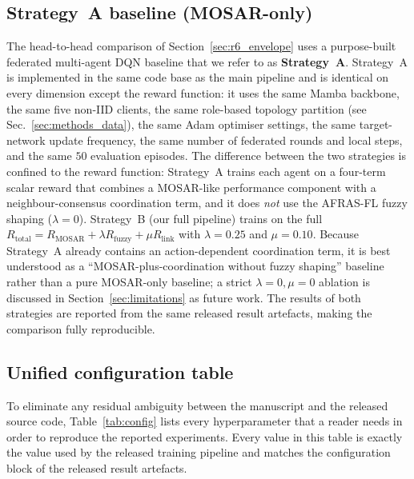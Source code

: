 \documentclass[ai,article,submit,moreauthors,pdftex]{Definitions/mdpi}
\newcommand{\rev}[1]{#1}
\begin{document}
\subsection{Strategy~A baseline (MOSAR-only)}\label{sec:methods_strategy_a}

The head-to-head comparison of Section~\ref{sec:r6_envelope} uses a
purpose-built federated multi-agent DQN baseline that we refer to as
\textbf{Strategy~A}. Strategy~A is implemented in the same code base as
the main pipeline and is identical on every dimension except the reward
function: it uses the same Mamba backbone, the same five non-IID
clients, \rev{the same role-based topology partition (see Sec.~\ref{sec:methods_data})}, the same
Adam optimiser settings, the same target-network update frequency, the
same number of federated rounds and local steps, and the same $50$
evaluation episodes. \rev{The difference between the two strategies is confined to the reward function: Strategy~A trains each agent on a four-term scalar reward that combines a MOSAR-like performance component with a neighbour-consensus coordination term, and it does \emph{not} use the AFRAS-FL fuzzy shaping ($\lambda = 0$). Strategy~B (our full pipeline) trains on the full $R_{\text{total}} = R_{\text{MOSAR}} + \lambda R_{\text{fuzzy}} + \mu R_{\text{link}}$ with $\lambda = 0.25$ and $\mu = 0.10$. Because Strategy~A already contains an action-dependent coordination term, it is best understood as a ``MOSAR-plus-coordination without fuzzy shaping'' baseline rather than a pure MOSAR-only baseline; a strict $\lambda = 0, \mu = 0$ ablation is discussed in Section~\ref{sec:limitations} as future work.} The results of both strategies are
reported from the same released result artefacts, making the comparison fully reproducible.

\rev{\subsection{Unified configuration table}\label{sec:methods_config}
To eliminate any residual ambiguity between the manuscript and the
released source code, Table~\ref{tab:config} lists every hyperparameter
that a reader needs in order to reproduce the reported experiments.
Every value in this table is exactly the value used by the released
training pipeline and matches the configuration block of the released
result artefacts.}
\end{document}

